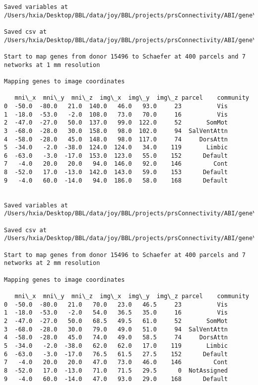 \documentclass[11pt]{article}
\begin{document}
\begin{Verbatim}[commandchars=\\\{\}]
Saved variables at /Users/hxia/Desktop/BBL/data/joy/BBL/projects/prsConnectivity/ABI/gene\_mapping/15496donor\_200Parcels\_17Network\_2mm.pkl

Saved csv at /Users/hxia/Desktop/BBL/data/joy/BBL/projects/prsConnectivity/ABI/gene\_mapping/15496donor\_200Parcels\_17Network\_2mm.csv

Start to map genes from donor 15496 to Schaefer at 400 parcels and 7 networks at 1 mm resolution

Mapping genes to image coordinates

   mni\_x  mni\_y  mni\_z  img\_x  img\_y  img\_z parcel    community
0  -50.0  -80.0   21.0  140.0   46.0   93.0     23          Vis
1  -18.0  -53.0   -2.0  108.0   73.0   70.0     16          Vis
2  -47.0  -27.0   50.0  137.0   99.0  122.0     52       SomMot
3  -68.0  -28.0   30.0  158.0   98.0  102.0     94  SalVentAttn
4  -58.0  -28.0   45.0  148.0   98.0  117.0     74     DorsAttn
5  -34.0   -2.0  -38.0  124.0  124.0   34.0    119       Limbic
6  -63.0   -3.0  -17.0  153.0  123.0   55.0    152      Default
7   -4.0   20.0   20.0   94.0  146.0   92.0    146         Cont
8  -52.0   17.0  -13.0  142.0  143.0   59.0    153      Default
9   -4.0   60.0  -14.0   94.0  186.0   58.0    168      Default


Saved variables at /Users/hxia/Desktop/BBL/data/joy/BBL/projects/prsConnectivity/ABI/gene\_mapping/15496donor\_400Parcels\_7Network\_1mm.pkl

Saved csv at /Users/hxia/Desktop/BBL/data/joy/BBL/projects/prsConnectivity/ABI/gene\_mapping/15496donor\_400Parcels\_7Network\_1mm.csv

Start to map genes from donor 15496 to Schaefer at 400 parcels and 7 networks at 2 mm resolution

Mapping genes to image coordinates

   mni\_x  mni\_y  mni\_z  img\_x  img\_y  img\_z parcel    community
0  -50.0  -80.0   21.0   70.0   23.0   46.5     23          Vis
1  -18.0  -53.0   -2.0   54.0   36.5   35.0     16          Vis
2  -47.0  -27.0   50.0   68.5   49.5   61.0     52       SomMot
3  -68.0  -28.0   30.0   79.0   49.0   51.0     94  SalVentAttn
4  -58.0  -28.0   45.0   74.0   49.0   58.5     74     DorsAttn
5  -34.0   -2.0  -38.0   62.0   62.0   17.0    119       Limbic
6  -63.0   -3.0  -17.0   76.5   61.5   27.5    152      Default
7   -4.0   20.0   20.0   47.0   73.0   46.0    146         Cont
8  -52.0   17.0  -13.0   71.0   71.5   29.5      0  NotAssigned
9   -4.0   60.0  -14.0   47.0   93.0   29.0    168      Default



\end{Verbatim}
\end{document}
